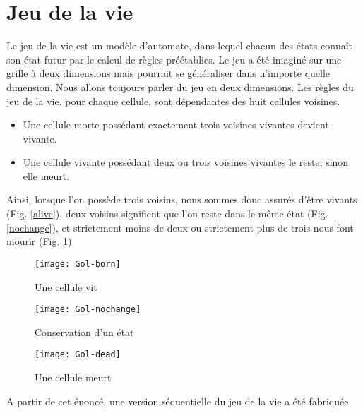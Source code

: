 \section{Jeu de la vie} %
\label{sec:jeu_de_la_vie}

Le jeu de la vie est un modèle d'automate, dans lequel chacun des états connaît son état futur par le calcul de règles préétablies. Le jeu a été imaginé sur une grille à deux dimensions mais pourrait se généraliser dans n'importe quelle dimension. Nous allons toujours parler du jeu en deux dimensions. Les règles du jeu de la vie, pour chaque cellule, sont dépendantes des huit cellules voisines.
\begin{itemize}
\item Une cellule morte possédant exactement trois voisines vivantes devient vivante.
\item Une cellule vivante possédant deux ou trois voisines vivantes le reste, sinon elle meurt.
\end{itemize}

Ainsi, lorsque l'on possède trois voisins, nous sommes donc assurés d'être vivants (Fig. \ref{alive}), deux voisins signifient que l'on reste dans le même état (Fig. \ref{nochange}), et strictement moins de deux ou strictement plus de trois nous font mourir (Fig. \ref{dead})

\begin{figure}[h!]
\centering
\begin{minipage}{.3\textwidth}
\centering
\texttt{[image: Gol-born]}
\caption{Une cellule vit}
\label{alive}
\end{minipage}
\hspace{0.5cm}
\begin{minipage}{0.3\textwidth}
\centering
\texttt{[image: Gol-nochange]}
\caption{Conservation d'un état}
\label{nochange}
\end{minipage}
\hspace{0.5cm}
\begin{minipage}{.3\textwidth}
\centering
\texttt{[image: Gol-dead]}
\caption{Une cellule meurt}
\label{dead}
\end{minipage}
\end{figure}


A partir de cet énoncé, une version séquentielle du jeu de la vie a été fabriquée. 